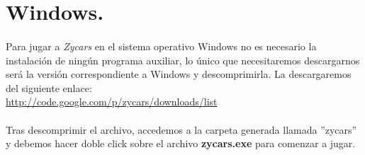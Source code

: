 \section{Windows.}

\paragraph{}
Para jugar a \emph{Zycars} en el sistema operativo Windows no es necesario la instalación de ningún programa
auxiliar, lo único que necesitaremos descargarnos será la versión correspondiente
a Windows y descomprimirla. La descargaremos
del siguiente enlace:\\

\url{http://code.google.com/p/zycars/downloads/list}

\paragraph{}
Tras descomprimir el archivo, accedemos a la carpeta generada llamada ''zycars'' y debemos hacer doble click 
sobre el archivo \textbf{zycars.exe} para comenzar a jugar.
